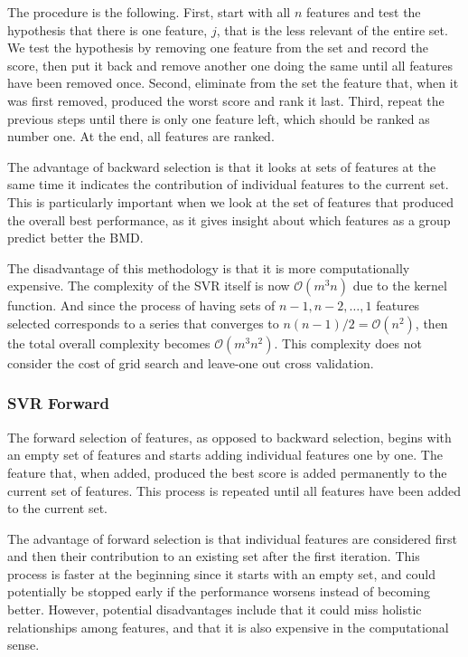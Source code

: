 \documentclass{bmcart}
\begin{document}
The procedure is the following. First, start with all $n$ features and test the
hypothesis that there is one feature, $j$, that is the less relevant of the
entire set. We test the hypothesis by removing one feature from the set and
record the score, then put it back and remove another one doing the same
until all features have been removed once. Second, eliminate from the set the feature that,
when it was first removed, produced the worst score and rank it last. Third, repeat the
previous steps until there is only one feature left, which should be ranked as
number one. At the end, all features are ranked.

The advantage of backward selection is that it looks at sets of features at the
same time it indicates the contribution of individual features to the current
set. This is particularly important when
we look at the set of features that produced the overall best performance, as
it gives insight about which features as a group predict better the BMD.

The disadvantage of this methodology is that it is more computationally
expensive. The complexity of the SVR itself is now $\mathcal{O}(m^3n)$ due to
the kernel function. And since the process of having sets of 
$n-1, n-2, \dots, 1$
features selected corresponds to a series that converges 
to $n(n-1)/2 = \mathcal{O}(n^2)$, then the total overall
complexity becomes $\mathcal{O}(m^3n^2)$.  This complexity does not consider
the cost of grid search and leave-one out cross validation.  

\subsubsection*{SVR Forward}
The forward selection of features, as opposed to backward selection, begins
with an empty set of features and starts adding individual features one by one.
The feature that, when added, produced the best score is added permanently to
the current set of features. This process is repeated until all features have
been added to the current set.

The advantage of forward selection is that individual features are considered
first and then their contribution to an existing set after the first iteration.
This process is faster at the beginning since it starts with an empty set, and
could potentially be stopped early if the performance worsens instead of
becoming better. However, potential disadvantages include that it could miss
holistic relationships among features, and that it is also expensive in the
computational sense.
\end{document}
